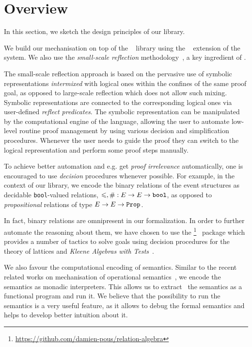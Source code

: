 \section{Overview}

In this section, we sketch the design principles of our library. 

We build our mechanisation on top of the \mathcomp~\cite{Mahboubi-Tassi:MATHCOMP17} library 
using the \ssreflect~\cite{Gonthier-al:SSR2016} extension of the \coq system.
We also use the \emph{small-scale reflection} 
methodology~\cite{Gonthier-Assia:SSR2010, Gonthier-al:SSR2016}, 
a key ingredient of \ssreflect. 

The small-scale reflection approach is based on 
the pervasive use of symbolic representations \emph{intermixed}
with logical ones within the confines of the same proof goal,
as opposed to large-scale reflection which does not allow such mixing.
Symbolic representations are connected to the corresponding logical ones
via user-defined \emph{reflect predicates}.
The symbolic representation can be manipulated 
by the computational engine of the language, 
allowing the user to automate low-level routine 
proof management by using various decision 
and simplification procedures.
Whenever the user needs to guide the proof 
they can switch to the logical representation
and perform some proof steps manually. 

To achieve better automation and e.g. get \emph{proof irrelevance}
automatically, one is encouraged
to use \emph{decision} procedures whenever possible.
For example, in the context of our library, 
we encode the binary relations of the event structures
as decidable \texttt{bool}-valued relations, 
\ie $\leqslant, \# : E \rightarrow E \rightarrow \texttt{bool}$,
as opposed to \emph{propositional} 
relations of type $E \rightarrow E \rightarrow \texttt{Prop}$. 

In fact, binary relations are omnipresent in our formalization.
In order to further automate the reasoning about them, 
we have chosen to use the \relationalgebra%
\footnote{\url{https://github.com/damien-pous/relation-algebra}}~%
\cite{Pous-ITP2013} package 
which provides a number of tactics to solve goals using
decision procedures for the theory of lattices  
and \emph{Kleene Algebras with Tests}~\cite{Kozen:TOPLAS:1997}.

We also favour the computational encoding of semantics. 
Similar to the recent related works on mechanisation 
of operational semantics~\cite{Xia-al:POPL2019, Letan-al:CPP2020, Affeldt-al:ICMPC2019}, 
we encode the semantics as monadic interpreters.  
This allows us to extract~\cite{Letouzey:CCE2008} 
the semantics as a functional program and run it. 
We believe that the possibility to run the semantics 
is a very useful feature, as it allows 
to debug the formal semantics
and helps to develop better intuition about it.

